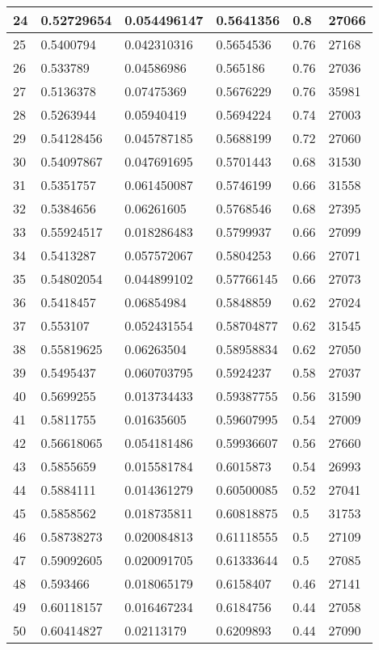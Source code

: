 \begin{longtable}{|l|l|l|l|l|l|}
24 & 0.52729654 & 0.054496147 & 0.5641356 & 0.8 & 27066 \\ \hline 
25 & 0.5400794 & 0.042310316 & 0.5654536 & 0.76 & 27168 \\ \hline 
26 & 0.533789 & 0.04586986 & 0.565186 & 0.76 & 27036 \\ \hline 
27 & 0.5136378 & 0.07475369 & 0.5676229 & 0.76 & 35981 \\ \hline 
28 & 0.5263944 & 0.05940419 & 0.5694224 & 0.74 & 27003 \\ \hline 
29 & 0.54128456 & 0.045787185 & 0.5688199 & 0.72 & 27060 \\ \hline 
30 & 0.54097867 & 0.047691695 & 0.5701443 & 0.68 & 31530 \\ \hline 
31 & 0.5351757 & 0.061450087 & 0.5746199 & 0.66 & 31558 \\ \hline 
32 & 0.5384656 & 0.06261605 & 0.5768546 & 0.68 & 27395 \\ \hline 
33 & 0.55924517 & 0.018286483 & 0.5799937 & 0.66 & 27099 \\ \hline 
34 & 0.5413287 & 0.057572067 & 0.5804253 & 0.66 & 27071 \\ \hline 
35 & 0.54802054 & 0.044899102 & 0.57766145 & 0.66 & 27073 \\ \hline 
36 & 0.5418457 & 0.06854984 & 0.5848859 & 0.62 & 27024 \\ \hline 
37 & 0.553107 & 0.052431554 & 0.58704877 & 0.62 & 31545 \\ \hline 
38 & 0.55819625 & 0.06263504 & 0.58958834 & 0.62 & 27050 \\ \hline 
39 & 0.5495437 & 0.060703795 & 0.5924237 & 0.58 & 27037 \\ \hline 
40 & 0.5699255 & 0.013734433 & 0.59387755 & 0.56 & 31590 \\ \hline 
41 & 0.5811755 & 0.01635605 & 0.59607995 & 0.54 & 27009 \\ \hline 
42 & 0.56618065 & 0.054181486 & 0.59936607 & 0.56 & 27660 \\ \hline 
43 & 0.5855659 & 0.015581784 & 0.6015873 & 0.54 & 26993 \\ \hline 
44 & 0.5884111 & 0.014361279 & 0.60500085 & 0.52 & 27041 \\ \hline 
45 & 0.5858562 & 0.018735811 & 0.60818875 & 0.5 & 31753 \\ \hline 
46 & 0.58738273 & 0.020084813 & 0.61118555 & 0.5 & 27109 \\ \hline 
47 & 0.59092605 & 0.020091705 & 0.61333644 & 0.5 & 27085 \\ \hline 
48 & 0.593466 & 0.018065179 & 0.6158407 & 0.46 & 27141 \\ \hline 
49 & 0.60118157 & 0.016467234 & 0.6184756 & 0.44 & 27058 \\ \hline 
50 & 0.60414827 & 0.02113179 & 0.6209893 & 0.44 & 27090 \\ \hline 
\end{longtable}